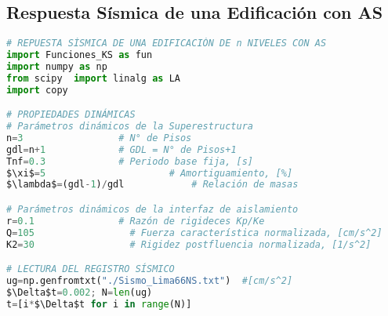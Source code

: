 \subsection*{Respuesta Sísmica de una Edificación con AS}
{}

\begin{MyFont}
	\begin{adjustwidth}{4.8mm}{}
		\begin{lstlisting}[language=Python, caption= {\footnotesize Edificación con aislamiento sísmico bilineal}, mathescape=true,label={Algoritmo1}]
# REPUESTA SÍSMICA DE UNA EDIFICACIÓN DE n NIVELES CON AS
import Funciones_KS as fun
import numpy as np
from scipy  import linalg as LA
import copy

# PROPIEDADES DINÁMICAS
# Parámetros dinámicos de la Superestructura
n=3                 # N° de Pisos
gdl=n+1             # GDL = N° de Pisos+1
Tnf=0.3             # Periodo base fija, [s]
$\xi$=5           			 # Amortiguamiento, [%]
$\lambda$=(gdl-1)/gdl 			 # Relación de masas

# Parámetros dinámicos de la interfaz de aislamiento
r=0.1               # Razón de rigideces Kp/Ke
Q=105          		  # Fuerza característica normalizada, [cm/s^2]
K2=30         		  # Rigidez postfluencia normalizada, [1/s^2]

# LECTURA DEL REGISTRO SÍSMICO
ug=np.genfromtxt("./Sismo_Lima66NS.txt")  #[cm/s^2]
$\Delta$t=0.002; N=len(ug)
t=[i*$\Delta$t for i in range(N)]

\end{lstlisting}
	\end{adjustwidth}
\end{MyFont}
